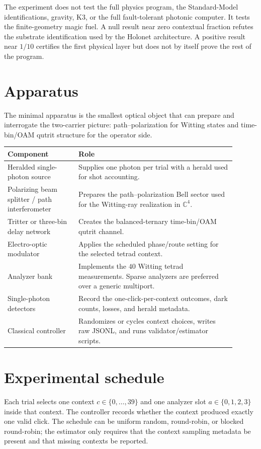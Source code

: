 \documentclass[11pt]{article}
\begin{document}
\begin{honestbox}
The experiment does not test the full physics program, the Standard-Model identifications, gravity, K3,
or the full fault-tolerant photonic computer.  It tests the finite-geometry magic fuel.  A null result
near zero contextual fraction refutes the substrate identification used by the Holonet architecture.  A
positive result near $1/10$ certifies the first physical layer but does not by itself prove the rest of the
program.
\end{honestbox}

\section{Apparatus}
The minimal apparatus is the smallest optical object that can prepare and interrogate the two-carrier
picture: path--polarization for Witting states and time-bin/OAM qutrit structure for the operator side.

\begin{center}
\begin{tabular}{p{0.28\linewidth}p{0.62\linewidth}}
\toprule
Component & Role\\
\midrule
Heralded single-photon source & Supplies one photon per trial with a herald used for shot accounting.\\
Polarizing beam splitter / path interferometer & Prepares the path--polarization Bell sector used for the Witting-ray realization in $\mathbb C^4$.\\
Tritter or three-bin delay network & Creates the balanced-ternary time-bin/OAM qutrit channel.\\
Electro-optic modulator & Applies the scheduled phase/route setting for the selected tetrad context.\\
Analyzer bank & Implements the $40$ Witting tetrad measurements.  Sparse analyzers are preferred over a generic multiport.\\
Single-photon detectors & Record the one-click-per-context outcomes, dark counts, losses, and herald metadata.\\
Classical controller & Randomizes or cycles context choices, writes raw JSONL, and runs validator/estimator scripts.\\
\bottomrule
\end{tabular}
\end{center}

\section{Experimental schedule}
Each trial selects one context $c\in\{0,\ldots,39\}$ and one analyzer slot $a\in\{0,1,2,3\}$ inside that
context.  The controller records whether the context produced exactly one valid click.  The schedule can
be uniform random, round-robin, or blocked round-robin; the estimator only requires that the context
sampling metadata be present and that missing contexts be reported.
\end{document}
